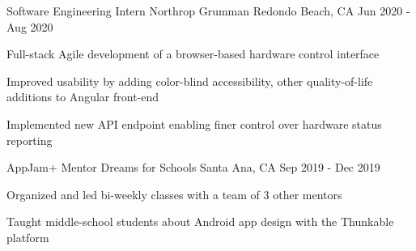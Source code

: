 
\begin{cventries}
	\cventry
	{Software Engineering Intern}
	{Northrop Grumman}
	{Redondo Beach, CA}
	{Jun 2020 - Aug 2020}
	{
		\begin{cvitems}
			\item{Full-stack Agile development of a browser-based hardware control interface}
			\item{Improved usability by adding color-blind accessibility, other quality-of-life additions to Angular front-end}
			\item{Implemented new API endpoint enabling finer control over hardware status reporting}
		\end{cvitems}
	}

	\cventry
	{AppJam+ Mentor}
	{Dreams for Schools}
	{Santa Ana, CA}
	{Sep 2019 - Dec 2019}
	{
	\begin{cvitems}
		\item{Organized and led bi-weekly classes with a team of 3 other mentors}
		\item{Taught middle-school students about Android app design with the Thunkable platform}
	\end{cvitems}
	}
\end{cventries}
